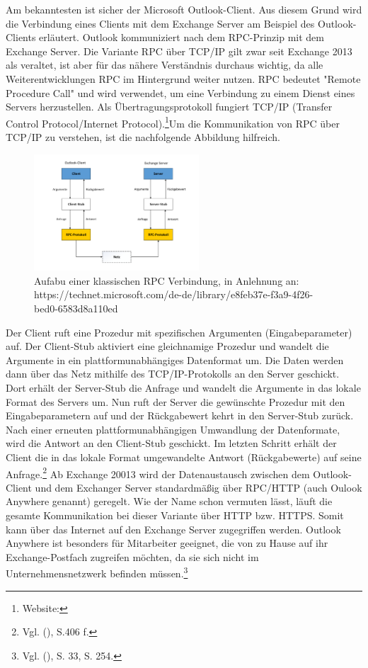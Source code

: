 Am bekanntesten ist sicher der Microsoft Outlook-Client. Aus diesem Grund wird die Verbindung eines Clients mit dem Exchange Server am Beispiel des Outlook-Clients erläutert. Outlook kommuniziert nach dem RPC-Prinzip mit dem Exchange Server. Die Variante RPC über TCP/IP  gilt zwar seit Exchange 2013 als veraltet, ist aber für das nähere Verständnis durchaus wichtig, da alle Weiterentwicklungen RPC im Hintergrund weiter nutzen. RPC bedeutet "Remote Procedure Call" und wird verwendet, um eine Verbindung zu einem Dienst eines Servers herzustellen. Als Übertragungsprotokoll fungiert TCP/IP (Transfer Control Protocol/Internet Protocol).\footnote{Website:\cite{MSXrpc}}Um die Kommunikation von RPC über TCP/IP zu verstehen, ist die nachfolgende Abbildung hilfreich.

\begin{figure}[h!]
\centering
	\includegraphics[width=0.55\textwidth]{Abbildungen/RPC_TCP.pdf}
	\caption[Aufbau einer klassischen RPC Verbindung]{Aufabu einer klassischen RPC Verbindung,    in Anlehnung an:\\https://technet.microsoft.com/de-de/library/e8feb37e-f3a9-4f26-bed0-6583d8a110ed}
	\label{fig:RPC_TCP}
\end{figure}

\noindent 
Der Client ruft eine Prozedur mit spezifischen Argumenten (Eingabeparameter) auf. Der Client-Stub aktiviert eine gleichnamige Prozedur und wandelt die Argumente in ein plattformunabhängiges Datenformat um. Die Daten werden dann über das Netz mithilfe des TCP/IP-Protokolls an den Server geschickt. Dort erhält der Server-Stub die Anfrage und wandelt die Argumente in das lokale Format des Servers um. Nun ruft der Server die gewünschte Prozedur mit den Eingabeparametern auf und der Rückgabewert kehrt in den Server-Stub zurück. Nach einer erneuten plattformunabhängigen Umwandlung der Datenformate, wird die Antwort an den Client-Stub geschickt. Im letzten Schritt erhält der Client die in das lokale Format umgewandelte Antwort (Rückgabewerte) auf seine Anfrage.\footnote{Vgl. \citeauthor{Schneider} (\citeyear{Schneider}), S.406 f.}\newline
Ab Exchange 20013 wird der Datenaustausch zwischen dem Outlook-Client und dem Exchanger Server standardmäßig über RPC/HTTP (auch Oulook Anywhere genannt) geregelt. Wie der Name schon vermuten lässt, läuft die gesamte Kommunikation bei dieser Variante über HTTP bzw. HTTPS. Somit kann über das Internet auf den Exchange Server zugegriffen werden. Outlook Anywhere ist besonders für Mitarbeiter geeignet, die von zu Hause auf ihr Exchange-Postfach zugreifen möchten, da sie sich nicht im Unternehmensnetzwerk befinden müssen.\footnote{Vgl. \citeauthor{Joos} (\citeyear{Joos}), S. 33, S. 254.}

